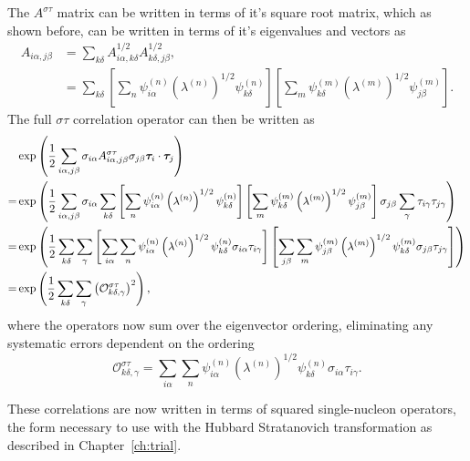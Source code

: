 The $A^{\sigma\tau}$ matrix can be written in terms of it's square root matrix, which as shown before, can be written in terms of it's eigenvalues and vectors as
\begin{align}
   A_{i\alpha,j\beta} &= \sum\limits_{k\delta} A^{1/2}_{i\alpha,k\delta}A^{1/2}_{k\delta,j\beta}, \\
      &= \sum\limits_{k\delta} \left[\sum\limits_n \psi_{i\alpha}^{(n)}\left(\lambda^{(n)}\right)^{1/2}\psi_{k\delta}^{(n)}\right] \left[\sum\limits_m \psi_{k\delta}^{(m)}\left(\lambda^{(m)}\right)^{1/2}\psi_{j\beta}^{(m)}\right].
\end{align}
The full $\sigma\tau$ correlation operator can then be written as
\begin{align}
   &\exp\left(\frac{1}{2}\sum\limits_{i\alpha,j\beta} \sigma_{i\alpha}A^{\sigma\tau}_{i\alpha,j\beta}\sigma_{j\beta}\bm{\tau}_i\cdot\bm{\tau}_j\right) \\
   =&\exp\left(\frac{1}{2}\sum\limits_{i\alpha,j\beta} \sigma_{i\alpha} \sum\limits_{k\delta} \left[\sum\limits_n \psi_{i\alpha}^{(n)}\left(\lambda^{(n)}\right)^{1/2}\psi_{k\delta}^{(n)}\right] \left[\sum\limits_m \psi_{k\delta}^{(m)}\left(\lambda^{(m)}\right)^{1/2}\psi_{j\beta}^{(m)}\right] \sigma_{j\beta}\sum\limits_\gamma\tau_{i\gamma}\tau_{j\gamma}\right) \\
   =&\exp\left(\frac{1}{2}\sum\limits_{k\delta}\sum\limits_\gamma \left[\sum\limits_{i\alpha}\sum\limits_n \psi_{i\alpha}^{(n)}\left(\lambda^{(n)}\right)^{1/2}\psi_{k\delta}^{(n)}\sigma_{i\alpha}\tau_{i\gamma}\right] \left[\sum\limits_{j\beta}\sum\limits_m \psi_{j\beta}^{(m)}\left(\lambda^{(m)}\right)^{1/2}\psi_{k\delta}^{(m)}\sigma_{j\beta}\tau_{j\gamma}\right] \right) \\
   =& \exp\left(\frac{1}{2}\sum\limits_{k\delta}\sum\limits_\gamma\left(\mathcal{O}^{\sigma\tau}_{k\delta,\gamma}\right)^2 \right),
\end{align}
where the operators now sum over the eigenvector ordering, eliminating any systematic errors dependent on the ordering
\begin{equation}
   \mathcal{O}^{\sigma\tau}_{k\delta,\gamma} = \sum\limits_{i\alpha}\sum\limits_n \psi_{i\alpha}^{(n)}\left(\lambda^{(n)}\right)^{1/2}\psi_{k\delta}^{(n)}\sigma_{i\alpha}\tau_{i\gamma}.
\end{equation}

These correlations are now written in terms of squared single-nucleon operators, the form necessary to use with the Hubbard Stratanovich transformation as described in Chapter~\ref{ch:trial}.
